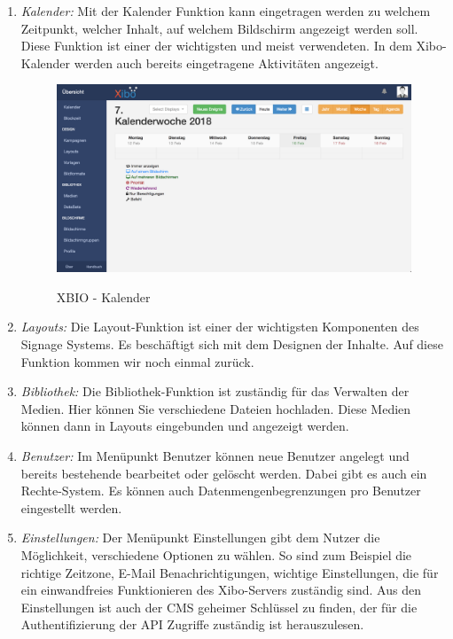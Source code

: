 \begin{enumerate}
	\item {\em Kalender:} Mit der Kalender Funktion kann eingetragen werden zu welchem Zeitpunkt, welcher Inhalt, auf welchem Bildschirm angezeigt werden soll. Diese Funktion ist einer der wichtigsten und meist verwendeten. In dem Xibo-Kalender werden auch bereits eingetragene Aktivitäten angezeigt.

\begin{figure}[H]
	\centering
\includegraphics[width=1\textwidth]{images/xibo-basics-calendar}
	\label{img:calendar}
	\caption{XBIO - Kalender}
\end{figure}	
	
	\item {\em Layouts:} 
	Die Layout-Funktion ist einer der wichtigsten Komponenten des Signage Systems. Es beschäftigt sich mit dem Designen der Inhalte. Auf diese Funktion kommen wir noch einmal zurück.
	
	\item {\em Bibliothek:} 
	Die Bibliothek-Funktion ist zuständig für das Verwalten der Medien. Hier können Sie verschiedene Dateien hochladen.  Diese Medien können dann in Layouts eingebunden und angezeigt werden.
	
	\item {\em Benutzer:} 
	Im Menüpunkt Benutzer können neue Benutzer angelegt und bereits bestehende bearbeitet oder gelöscht werden. Dabei gibt es auch ein Rechte-System. Es können auch Datenmengenbegrenzungen pro Benutzer eingestellt werden.
	
	\item {\em Einstellungen:} 
	Der Menüpunkt Einstellungen gibt dem Nutzer die Möglichkeit, verschiedene Optionen zu wählen. So sind zum Beispiel die richtige Zeitzone, E-Mail Benachrichtigungen, wichtige Einstellungen, die für ein einwandfreies Funktionieren des Xibo-Servers zuständig sind. Aus den Einstellungen ist auch der CMS geheimer Schlüssel zu finden, der für die Authentifizierung der API Zugriffe zuständig ist herauszulesen.
\end{enumerate}

